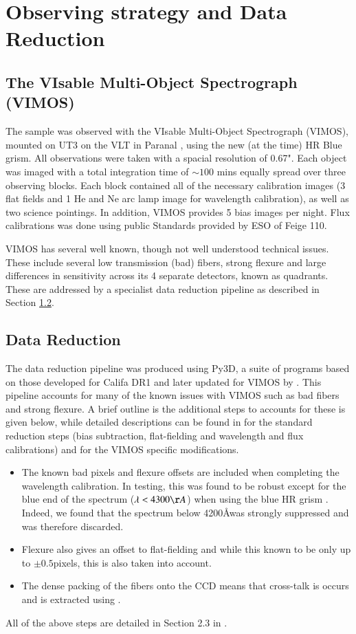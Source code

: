 \documentclass[fleqn,usenatbib,useAMS]{mnras}
\begin{document}
\section{Observing strategy and Data Reduction}
	\label{sec:obs}
	\subsection{The VIsable Multi-Object Spectrograph (VIMOS)}
		\label{subsec:VIMOS}
		The sample was observed with the VIsable Multi-Object Spectrograph (VIMOS), mounted on UT3 on the VLT in Paranal \citep{LeFevre2003}, using the new (at the time) HR Blue grism. All observations were taken with a spacial resolution of 0.67". Each object was imaged with a total integration time of $\sim 100$ mins equally spread over three observing blocks. Each block contained all of the necessary calibration images (3 flat fields and 1 He and Ne arc lamp image for wavelength calibration), as well as two science pointings. In addition, VIMOS provides 5 bias images per night. Flux calibrations was done using public Standards provided by ESO of Feige 110.

		VIMOS has several well known, though not well understood technical issues. These include several low transmission (bad) fibers, strong flexure and large differences in sensitivity across its 4 separate detectors, known as quadrants. These are addressed by a specialist data reduction pipeline as described in Section \ref{subsec:reduct}. 

	\subsection{Data Reduction}
		\label{subsec:reduct}
		The data reduction pipeline was produced using Py3D, a suite of programs based on those developed for Califa DR1 \citep{Sanchez2011, Husemann2013} and later updated for VIMOS by \citet{Husemann2014}. This pipeline accounts for many of the known issues with VIMOS such as bad fibers and strong flexure. A brief outline is the additional steps to accounts for these is given below, while detailed descriptions can be found in \citet{Sanchez2011} for the standard reduction steps (bias subtraction, flat-fielding and wavelength and flux calibrations) and \citep{Husemann2014} for the VIMOS specific modifications. 
		\begin{itemize}
		\item The known bad pixels and flexure offsets are included when completing the wavelength calibration. In testing, this was found to be robust except for the blue end of the spectrum ($\lambda < 4300 \AA$) when using the blue HR grism \citep{Husemann2014}. Indeed, we found that the spectrum below 4200\AA was strongly suppressed and was therefore discarded.
		\item Flexure also gives an offset to flat-fielding and while this known to be only up to $\pm0.5$pixels, this is also taken into account.
		\item The dense packing of the fibers onto the CCD means that cross-talk is occurs and is extracted using \citep{Horne1986}. 
		\end{itemize}
		All of the above steps are detailed in Section 2.3 in \citet{Husemann2014}.
\end{document}
